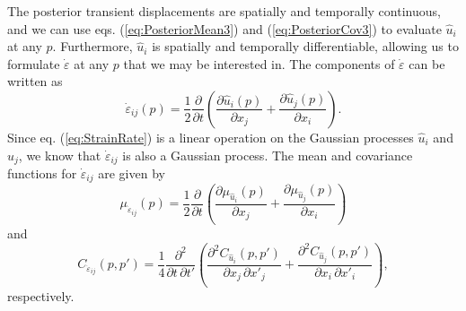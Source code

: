 \documentclass[extra,mreferee]{gji}
\begin{document}
The posterior transient displacements are spatially and temporally continuous, and we can use eqs. (\ref{eq:PosteriorMean3}) and (\ref{eq:PosteriorCov3}) to evaluate $\hat{u}_i$ at any $p$. Furthermore, $\hat{u}_i$ is spatially and temporally differentiable, allowing us to formulate $\dot\varepsilon$ at any $p$ that we may be interested in. The components of $\dot\varepsilon$ can be written as 
\begin{equation}\label{eq:StrainRate}
\dot\varepsilon_{ij}(p) = \frac{1}{2} \frac{\partial}{\partial t} \left(
                                        \frac{\partial \hat{u}_i(p)}{\partial x_j} +  
                                        \frac{\partial \hat{u}_j(p)}{\partial x_i}\right).
\end{equation}
Since eq. (\ref{eq:StrainRate}) is a linear operation on the Gaussian processes $\hat{u}_i$ and $\hat{u}_j$, we know that $\dot\varepsilon_{ij}$ is also a Gaussian process. The mean and covariance functions for $\dot{\varepsilon}_{ij}$ are given by
\begin{equation}\label{eq:StrainMean}
\mu_{\dot\varepsilon_{ij}}(p) = \frac{1}{2}\frac{\partial}{\partial t}\left(
                                  \frac{\partial \mu_{\hat{u}_i}(p)}{\partial x_j} + 
                                  \frac{\partial \mu_{\hat{u}_j}(p)}{\partial x_i} \right)
\end{equation} 
and
\begin{equation}\label{eq:StrainCov}
C_{\dot\varepsilon_{ij}}(p,p') = \frac{1}{4} \frac{\partial^2}{\partial t \, \partial t'}\left(
                                   \frac{\partial^2 C_{\hat{u}_i}(p,p')}{\partial x_j \, \partial x'_j} + 
                                   \frac{\partial^2 C_{\hat{u}_j}(p,p')}{\partial x_i \, \partial x'_i} \right),
\end{equation} 
respectively.
\end{document}
